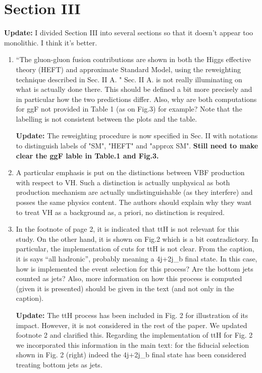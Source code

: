 \documentclass[12pt]{article}
\begin{document}
\section*{Section III}
{\bf Update:} I divided Section III into several sections so that it doesn't appear too monolithic. I think it's better. 
\begin{enumerate}
\item ``The gluon-gluon fusion contributions are shown in both the Higgs effective theory (HEFT) and approximate Standard Model, using the reweighting technique described in Sec. II A. " Sec. II A. is not really illuminating on what is actually done there. This should be defined a bit more precisely and in particular how the two predictions differ. Also, why are both computations for ggF not provided in Table 1 (as on Fig.3) for example? Note that the labelling is not consistent between the plots and the table.

{\bf Update:} The reweighting procedure is now specified in Sec. II with notations to distinguish labels of "SM", "HEFT" and "approx SM". {\bf Still need to make clear the ggF lable in Table.1 and Fig.3.}

\item A particular emphasis is put on the distinctions between VBF production with respect to VH. Such a distinction is actually unphysical as both production mechanism are actually undistinguishable (as they interfere) and posses the same physics content. The authors should explain why they want to treat VH as a background as, a priori, no distinction is required.
\item In the footnote of page 2, it is indicated that ttH is not relevant for this study. On the other hand, it is shown on Fig.2 which is a bit contradictory. In particular, the implementation of cuts for ttH is not clear. From the caption, it is says “all hadronic”, probably meaning a 4j+2j\_b final state. In this case, how is implemented the event selection for this process? Are the bottom jets counted as jets? Also, more information on how this process is computed (given it is presented) should be given in the text (and not only in the caption).

{\bf Update:} The ttH process has been included in Fig. 2 for illustration of its impact. However, it is not considered in the rest of the paper. We updated footnote 2 and clarified this. Regarding the implementation of ttH for Fig. 2 we incorporated this information in the main text: for the fiducial selection shown in Fig. 2 (right) indeed the 4j+2j\_b final state has been considered treating bottom jets as jets.


\end{enumerate}
\end{document}
